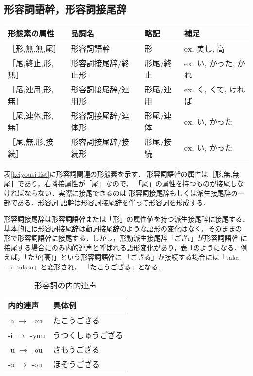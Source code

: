 \subsection{形容詞語幹，形容詞接尾辞}
\begin{table*}
\begin{center}
\begin{tabular}{|l|l|l|l|}
\hline
形態素の属性 & 品詞名 & 略記 & 補足 \\
\hline
［形,無,無,尾］ & 形容詞語幹 & 形 & ex. 美し, 高 \\
\hline
［尾,終止,形,無］ & 形容詞接尾辞/終止形 & 形尾/終止 & ex. い, かった, かれ \\
［尾,連用,形,無］ & 形容詞接尾辞/連用形 & 形尾/連用 & ex. く, くて, ければ \\
［尾,連体,形,無］ & 形容詞接尾辞/連体形 & 形尾/連体 & ex. い, かった \\
［尾,無,形,接続］ & 形容詞接尾辞/接続形 & 形尾/接続 & ex. い, かった \\
\hline
\end{tabular}
\end{center}
\caption{形容詞語幹，形容詞接尾辞}
\label{keiyousi-list}
\end{table*}

表\ref{keiyousi-list}に形容詞関連の形態素を示す．
形容詞語幹の属性は［形,無,無,尾］であり，右隣接属性が「尾」なので，
「尾」の属性を持つものが接尾しなければならない．実際に接尾できるのは
形容詞接尾辞もしくは派生接尾辞の一部である．形容詞
語幹は形容詞接尾辞を伴って形容詞を形成する．

形容詞接尾辞は形容詞語幹または「形」の属性値を持つ派生接尾辞に接尾する．
基本的には形容詞接尾辞は動詞接尾辞のような語形の変化はなく，そのままの
形で形容詞語幹に接尾する．しかし，形動派生接尾辞「ござr」が形容詞語幹
に接尾する場合にのみ内的連声と呼ばれる語形変化があり，表
\ref{adj_onbin}のようになる．例えば，「たか(高)」という形容詞語幹に
「ござる」が接続する場合には「taka $\rightarrow$ takou」と変形され，
「たこうござる」となる．

\begin{table}
\begin{center}
\begin{tabular}{|l|l|} \hline
内的連声 & 具体例 \\ \hline
-a $\rightarrow$ -ou & たこうござる \\
-i $\rightarrow$ -yuu & うつくしゅうござる \\
-u $\rightarrow$ -ou & さもうござる \\
-o $\rightarrow$ -ou & ほそうござる \\
\hline
\end{tabular}
\end{center}
\caption{形容詞の内的連声}
\label{adj_onbin}
\end{table}

